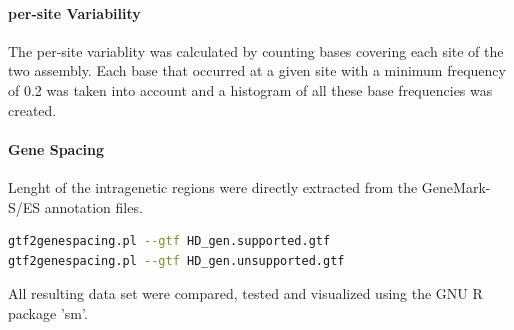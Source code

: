 \documentclass[12pt,a4paper]{scrartcl}
\begin{document}
\paragraph{per-site Variability}

The per-site variablity was calculated by counting bases covering each site of the two assembly. Each base that occurred at a given site with a minimum frequency of 0.2 was taken into account and a histogram of all these base frequencies was created.

\paragraph{Gene Spacing}

Lenght of the intragenetic regions were directly extracted from the GeneMark-S/ES annotation files.

\begin{lstlisting}[language=bash]
gtf2genespacing.pl --gtf HD_gen.supported.gtf 
gtf2genespacing.pl --gtf HD_gen.unsupported.gtf
\end{lstlisting}

All resulting data set were compared, tested and visualized using the GNU R package 'sm'.

\printbibliography
\end{document}
